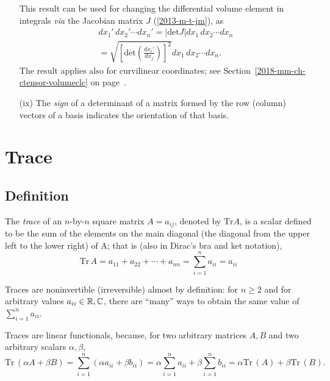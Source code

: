 \begin{itemize}
This result can be used for changing the differential volume element in integrals {\it via} the Jacobian matrix
$J
$
(\ref{2013-m-t-jm}), as
\begin{equation}
\begin{split}
dx_1'\, dx_2' \cdots dx_n'
= \vert \textrm{det} J \vert dx_1\, dx_2 \cdots dx_n     \\
= \sqrt{\left[\text{det}\left(\frac{dx_i'}{dx_j}\right)\right]^2} dx_1\, dx_2 \cdots dx_n
.
\end{split}
\label{2018-mm-ch-fdvs-jacoinfvol}
\end{equation}
The result applies also for curvilinear coordinates; see Section~\ref{2018-mm-ch-ctensor-volumeclc}
on page~\pageref{2018-mm-ch-ctensor-volumeclc}.

\item[(ix)]
The {\em sign} of a  determinant of a matrix formed by the row (column)
 vectors of a basis indicates the {orientation}
of that basis.

\end{itemize}


\section{Trace}
\label{2013-ch-fdvs-trace}

\subsection{Definition}
The {\em trace} of an $n$-by-$n$ square matrix $A=a_{ij}$, denoted by
$\textrm{Tr} A$,  is a scalar
defined to be the sum of the elements on the main diagonal
 (the diagonal from the upper left to the lower right) of A; that is  (also in Dirac's bra and ket notation),
\begin{equation}
\textrm{Tr}\,A
= a_{11} +a_{22}+ \cdots +a_{nn}
=\sum_{i=1}^n a_{ii}
=  a_{ii}%
\end{equation}

Traces are noninvertible (irreversible) almost by definition: for $n\ge 2$ and for arbitrary values $a_{ii} \in {\Bbb R}, {\Bbb C}$, there are
``many''  ways to obtain the same value of $ \sum_{i=1}^n a_{ii} $.

Traces are linear functionals, because, for two arbitrary matrices $A,B$
and two arbitrary scalars $\alpha, \beta$,
\begin{equation}
\textrm{Tr}\,(\alpha A + \beta B)
=\sum_{i=1}^n (\alpha a_{ii} + \beta b_{ii})
= \alpha \sum_{i=1}^n a_{ii} + \beta \sum_{i=1}^n  b_{ii}
=
\alpha \textrm{Tr}\,(A)+ \beta \textrm{Tr}\,(B)
.
\end{equation}

